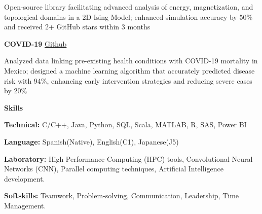 \documentclass[6pt]{article}
\begin{document}
Open-source library facilitating advanced analysis of energy, magnetization, and topological domains in a 2D Ising Model; enhanced simulation accuracy by 50\% and received 2+ GitHub stars within 3 months

\vspace{12pt}

\textbf{COVID-19} \hfill \href{https://github.com/erick-rios/COVID19-erick-rios}{Github}

Analyzed data linking pre-existing health conditions with COVID-19 mortality in Mexico; designed a machine learning algorithm that accurately predicted disease risk with 94\%, enhancing early intervention strategies and reducing severe cases by 20\%

\vspace{12pt}
\begin{center}
    \textbf{Skills}
\end{center}
\textbf{Technical:} C/C++, Java, Python, SQL, Scala, MATLAB, R, SAS, Power BI

\textbf{Language:} Spanish(Native), English(C1), Japanese(J5)

\textbf{Laboratory:} High Performance Computing (HPC) tools, Convolutional Neural Networks (CNN), Parallel computing techniques, Artificial Intelligence development.

\textbf{Softskills:} Teamwork, Problem-solving, Communication, Leadership, Time Management.
\end{document}
